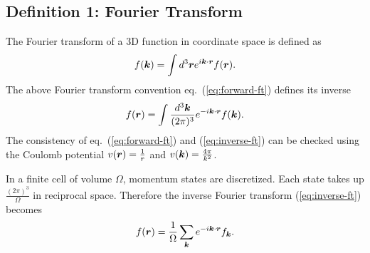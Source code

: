 \subsection{Definition 1: Fourier Transform}
\label{sec:def-ft}
The Fourier transform of a 3D function in coordinate space is defined as
\begin{align}
f(\boldsymbol{k}) = \int d^3\boldsymbol{r} e^{i\boldsymbol{k}\cdot\boldsymbol{r}} f(\boldsymbol{r}). \label{eq:forward-ft}
\end{align}
The above Fourier transform convention eq.~(\ref{eq:forward-ft}) defines its inverse
\begin{align}
f(\boldsymbol{r}) = \int \frac{d^3\boldsymbol{k}}{(2\pi)^3} e^{-i\boldsymbol{k}\cdot\boldsymbol{r}} f(\boldsymbol{k}). \label{eq:inverse-ft}
\end{align}
The consistency of eq.~(\ref{eq:forward-ft}) and (\ref{eq:inverse-ft}) can be checked using the Coulomb potential $v(\boldsymbol{r})=\frac{1}{r}$ and $v(\boldsymbol{k})=\frac{4\pi}{k^2}$. 

In a finite cell of volume $\Omega$, momentum states are discretized. Each state takes up $\frac{(2\pi)^3}{\Omega}$ in reciprocal space. Therefore the inverse Fourier transform (\ref{eq:inverse-ft}) becomes
\begin{align} \label{eq:lattice-ift}
f(\boldsymbol{r}) = \frac{1}{\Omega} \sum\limits_{\boldsymbol{k}} e^{-i\boldsymbol{k}\cdot\boldsymbol{r}} f_{\boldsymbol{k}}.
\end{align}

